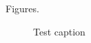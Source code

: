 \documentclass[12pt]{article}
\begin{document}




\clearpage


Figures.

\begin{figure}
\caption{Test caption}
\end{figure}
\end{document}

